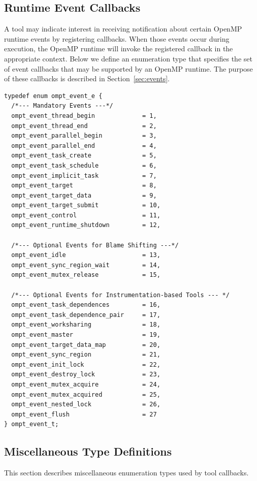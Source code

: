 \documentclass{article}
\begin{document}
\subsection{Runtime Event Callbacks}
\label{appendix:ompt-types:events}

A tool may indicate interest in receiving notification about certain OpenMP runtime events by registering callbacks. 
When those events occur during execution, the OpenMP runtime will invoke the registered callback in the appropriate context.
Below we define an enumeration type that specifies the set of event callbacks that may be supported by an OpenMP runtime. 
The purpose of these callbacks is described in Section~\ref{sec:events}. 

\begin{lstlisting}
typedef enum ompt_event_e {  
  /*--- Mandatory Events ---*/
  ompt_event_thread_begin             = 1,
  ompt_event_thread_end               = 2,
  ompt_event_parallel_begin           = 3,
  ompt_event_parallel_end             = 4,
  ompt_event_task_create              = 5,
  ompt_event_task_schedule            = 6,
  ompt_event_implicit_task            = 7,
  ompt_event_target                   = 8,
  ompt_event_target_data              = 9,
  ompt_event_target_submit            = 10,
  ompt_event_control                  = 11,
  ompt_event_runtime_shutdown         = 12,

  /*--- Optional Events for Blame Shifting ---*/
  ompt_event_idle                     = 13,
  ompt_event_sync_region_wait         = 14,
  ompt_event_mutex_release            = 15,

  /*--- Optional Events for Instrumentation-based Tools --- */
  ompt_event_task_dependences         = 16,
  ompt_event_task_dependence_pair     = 17,
  ompt_event_worksharing              = 18,
  ompt_event_master                   = 19,
  ompt_event_target_data_map          = 20,
  ompt_event_sync_region              = 21,
  ompt_event_init_lock                = 22,
  ompt_event_destroy_lock             = 23,
  ompt_event_mutex_acquire            = 24,
  ompt_event_mutex_acquired           = 25,
  ompt_event_nested_lock              = 26,
  ompt_event_flush                    = 27
} ompt_event_t;
\end{lstlisting}

\clearpage  
\subsection{Miscellaneous Type Definitions}
\label{appendix:ompt-types:misc}
This section describes miscellaneous enumeration types used by tool callbacks.
\end{document}
